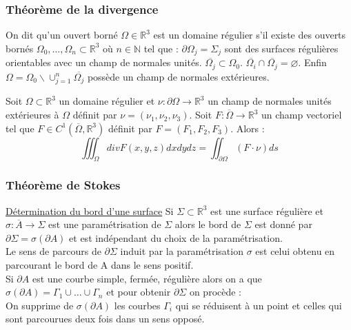 \documentclass[../main.tex]{subfiles}
\begin{document}
\subsubsection{Théorème de la divergence}
On dit qu'un ouvert borné $\Omega \in \mathbb{R}^3$ est un domaine régulier s'il existe des ouverts bornés $\Omega_0, \dots, \Omega_n \subset \mathbb{R}^3$ où $n\in \mathbb{N}$ tel que : $\partial \Omega_j = \Sigma_j$ sont des surfaces régulières orientables avec un champ de normales unités. $\overline{\Omega_j}\subset \Omega_0$. $\overline{\Omega_i}\cap \overline{\Omega_j} = \varnothing$. Enfin $\Omega = \Omega_0\backslash \cup_{j=1}^n \overline{\Omega_j}$ possède un champ de normales extérieures.\\

\begin{theorem}
Soit $\Omega\subset \mathbb{R}^3$ un domaine régulier et $\nu : \partial \Omega \rightarrow \mathbb{R}^3$ un champ de normales unités extérieures à $\Omega$ définit par $\nu = (\nu_1, \nu_2, \nu_3)$. Soit $F:\overline{\Omega} \rightarrow \mathbb{R}^3$ un champ vectoriel tel que $F\in C^1(\overline{\Omega}, \mathbb{R}^3)$ définit par $F=(F_1, F_2, F_3)$. Alors :\\
\begin{equation}
    \iiint_{\Omega} div F(x,y,z)dxdydz = \iint_{\partial \Omega} (F\cdot \nu) ds
\end{equation}
\end{theorem}

\subsubsection{Théorème de Stokes}
\quad \underline{Détermination du bord d'une surface}
Si $\Sigma \subset \mathbb{R}^3$ est une surface régulière et $\sigma : \overline{A}\rightarrow \Sigma$ est une paramétrisation de $\Sigma$ alors le bord de $\Sigma$ est donné par $\partial \Sigma = \sigma(\partial A)$ et est indépendant du choix de la paramétrisation.\\

Le sens de parcours de $\partial \Sigma$ induit par la paramétrisation $\sigma$ est celui obtenu en parcourant le bord de A dans le sens positif.\\

Si $\partial A$ est une courbe simple, fermée, régulière alors on a que \\
$\sigma(\partial A) = \Gamma_1 \cup \dots \cup \Gamma_n$ et pour obtenir $\partial \Sigma$ on procède :\\
On supprime de $\sigma(\partial A)$ les courbes $\Gamma_i$ qui se réduisent à un point et celles qui sont parcourues deux fois dans un sens opposé.\\
\end{document}
